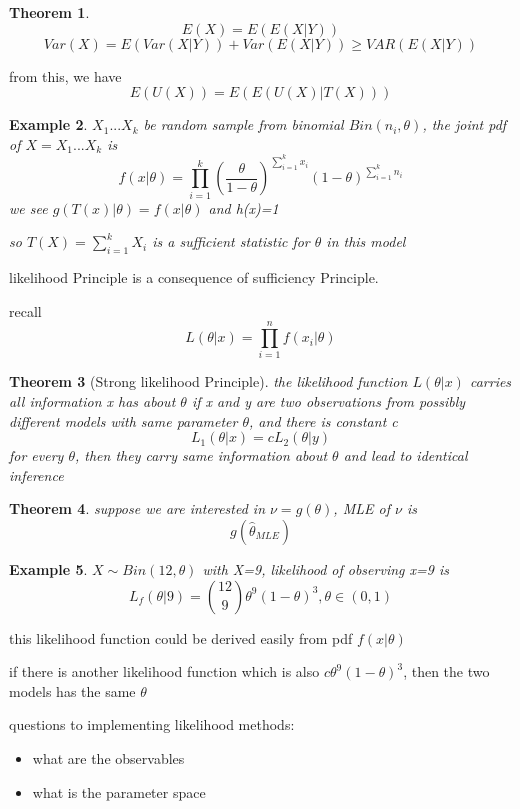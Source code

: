 \documentclass[10pt]{article}
\theoremstyle{break}
\newtheorem{thm}{Theorem}[subsection]
\newtheorem{ex}[thm]{Example}
\begin{document}
\begin{thm}
    $$E(X)=E(E(X|Y))$$
    $$Var(X)=E(Var(X|Y))+Var(E(X|Y))\geq VAR(E(X|Y))$$
\end{thm}
from this, we have $$E(U(X))=E(E(U(X)|T(X)))$$

\begin{ex}
    $X_1 ... X_k$ be random sample from binomial $Bin(n_i, \theta)$,
    the joint pdf of $X=X_1 ... X_k$ is 
    $$f(x|\theta) = \prod^k_{i=1}\left(\frac{\theta}{1-\theta}\right)^{\sum^k_{i=1}x_i}
    (1-\theta)^{\sum^k_{i=1}n_i}$$
    we see $g(T(x)|\theta)=f(x|\theta)$ and h(x)=1

    so $T(X)=\sum^k_{i=1} X_i$ is a sufficient statistic for $\theta$ in this model
\end{ex}

likelihood Principle is a consequence of sufficiency Principle.

recall $$L(\theta|x) = \prod^n_{i=1}f(x_i|\theta)$$

\begin{thm}[Strong likelihood Principle]
    the likelihood function $L(\theta|x)$ carries all information x has about $\theta$
    if x and y are two observations from possibly different models with same parameter $\theta$,
    and there is constant c $$L_1(\theta|x)=cL_2(\theta|y)$$
    for every $\theta$, then they carry same information about $\theta$ and lead to identical inference
\end{thm}

\begin{thm}
    suppose we are interested in $\nu=g(\theta)$, MLE of $\nu$ is $$g(\hat{\theta}_{MLE})$$
\end{thm}

\begin{ex}
    $X\sim Bin(12,\theta)$ with X=9, likelihood of observing x=9 is 
    $$L_f(\theta|9) = {12\choose 9}\theta^9(1-\theta)^3,\theta\in(0,1)$$
\end{ex}
this likelihood function could be derived easily from pdf $f(x|\theta)$



if there is another likelihood function which is also $c\theta^9(1-\theta)^3$,
then the two models has the same $\theta$

questions to implementing likelihood methods:
\begin{itemize}
    \item what are the observables 
    \item what is the parameter space
\end{itemize}
\end{document}
